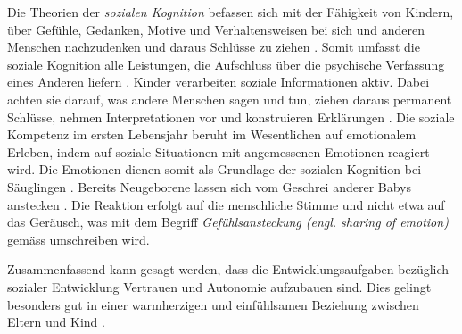 Die Theorien der \textit{sozialen Kognition} befassen sich mit der Fähigkeit von Kindern, über Gefühle, Gedanken, Motive und Verhaltensweisen bei sich und anderen Menschen nachzudenken und daraus Schlüsse zu ziehen \cite[S.~486ff]{Siegler2008}. Somit umfasst die soziale Kognition alle Leistungen, die Aufschluss über die psychische Verfassung eines Anderen liefern \cite[S.~237ff]{Bischof2011}. Kinder verarbeiten soziale Informationen aktiv. Dabei achten sie darauf, was andere Menschen sagen und tun, ziehen daraus permanent Schlüsse, nehmen Interpretationen vor und konstruieren Erklärungen \cite{Siegler2008}. Die soziale Kompetenz im ersten Lebensjahr beruht im Wesentlichen auf emotionalem Erleben, indem auf soziale Situationen mit angemessenen Emotionen reagiert wird. Die Emotionen dienen somit als Grundlage der sozialen Kognition bei Säuglingen \cite{Bischof2011}. Bereits Neugeborene lassen sich vom Geschrei anderer Babys anstecken \cite{Simner1971}. Die Reaktion erfolgt auf die menschliche Stimme und nicht etwa auf das Geräusch, was mit dem Begriff \textit{Gefühlsansteckung (engl. sharing of emotion)} gemäss  umschreiben wird.

Zusammenfassend kann gesagt werden, dass die Entwicklungsaufgaben bezüglich sozialer Entwicklung Vertrauen und Autonomie aufzubauen sind. Dies gelingt besonders gut in einer warmherzigen und einfühlsamen Beziehung zwischen Eltern und Kind \cite[S.~224]{Berk2011}.

